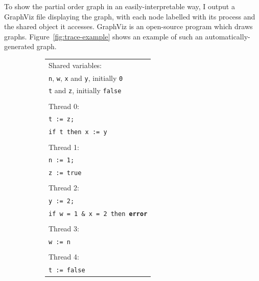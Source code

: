 \documentclass[12pt,a4paper,twoside,openany]{report}
\begin{document}
To show the partial order graph in an
easily-interpretable way, I
output a GraphViz file displaying the
graph, with each node
labelled with its process and the
shared object it accesses.
GraphViz is an open-source program which
draws graphs.
Figure~\ref{fig:trace-example}
shows an example of such an
automatically-generated graph.

\begin{figure}
	\centering
	\begin{subfigure}{0.5\textwidth}
		\centering
		\begin{tabular}{l}
			Shared variables: \\
			\qquad \texttt{n}, \texttt{w},
			\texttt{x} and \texttt{y},
			initially \texttt{0} \\
			\qquad \texttt{t} and \texttt{z},
			initially \texttt{false} \\
			\\
			Thread 0: \\
			\qquad \texttt{t := z;} \\
			\qquad \texttt{if t then x := y} \\
			\\
			Thread 1: \\
			\qquad \texttt{n := 1;} \\
			\qquad \texttt{z := true} \\
			\\
			Thread 2: \\
			\qquad \texttt{y := 2;} \\
			\qquad \texttt{if w = 1 \& x = 2 then \textbf{error}} \\
			\\
			Thread 3: \\
			\qquad \texttt{w := n} \\
			\\
			Thread 4: \\
			\qquad \texttt{t := false} \\
		\end{tabular}
	\end{subfigure}%
	\begin{subfigure}{0.5\textwidth}
		\centering

\end{subfigure}
\end{figure}
\end{document}
